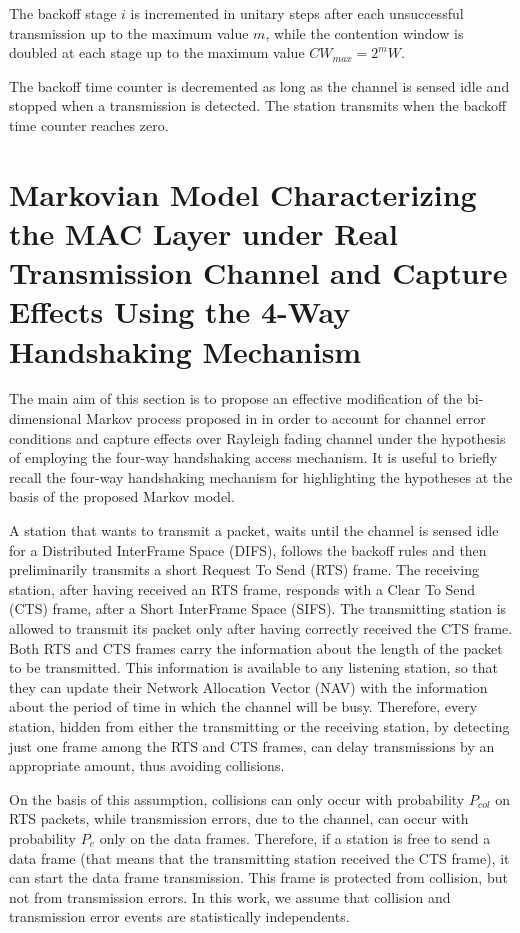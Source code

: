 \documentclass[10pt,onecolumn,a4paper]{IEEEtran}
\begin{document}
The backoff stage $i$ is incremented in unitary steps after each
unsuccessful transmission up to the maximum value $m$, while the
contention window is doubled at each stage up to the maximum value
$CW_{max}=2^m W$.

The backoff time counter is decremented as long as the channel is
sensed idle and stopped when a transmission is detected. The
station transmits when the backoff time counter reaches zero.
\section{Markovian Model Characterizing the MAC Layer under Real
Transmission Channel and Capture Effects Using the 4-Way
Handshaking Mechanism}
The main aim of this section is to propose an effective
modification of the bi-dimensional Markov process proposed in
\cite{Bianchi} in order to account for channel error conditions
and capture effects over Rayleigh fading channel under the
hypothesis of employing the four-way handshaking access mechanism.
It is useful to briefly recall the four-way handshaking mechanism
for highlighting the hypotheses at the basis of the proposed
Markov model.

A station that wants to transmit a packet, waits until the channel
is sensed idle for a Distributed InterFrame Space (DIFS), follows
the backoff rules and then preliminarily transmits a short Request
To Send (RTS) frame. The receiving station, after having received
an RTS frame, responds with a Clear To Send (CTS) frame, after a
Short InterFrame Space (SIFS). The transmitting station is allowed
to transmit its packet only after having correctly received the
CTS frame. Both RTS and CTS frames carry the information about the
length of the packet to be transmitted. This information is
available to any listening station, so that they can update their
Network Allocation Vector (NAV) with the information about the
period of time in which the channel will be busy. Therefore, every
station, hidden from either the transmitting or the receiving
station, by detecting just one frame among the RTS and CTS frames,
can delay transmissions by an appropriate amount, thus avoiding
collisions.

On the basis of this assumption, collisions can only occur with
probability $P_{col}$ on RTS packets, while transmission errors,
due to the channel, can occur with probability $P_e$ only on the
data frames. Therefore, if a station is free to send a data frame
(that means that the transmitting station received the CTS frame),
it can start the data frame transmission. This frame is protected
from collision, but not from transmission errors. In this work, we
assume that collision and transmission error events are
statistically independents.
\end{document}
